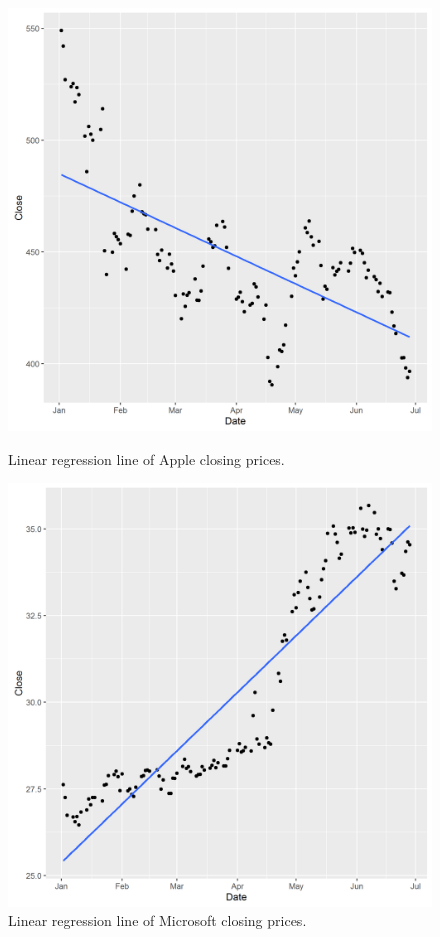 \documentclass[paper=a4, fontsize=11pt]{scrartcl} %
\numberwithin{equation}{section} %
\numberwithin{figure}{section} %
\numberwithin{table}{section} %
\begin{document}
\begin{figure}[!htb]
  \includegraphics[width=\linewidth]{graph/a_reg5.png}
  \caption{Linear regression line of Apple closing prices.}
\endminipage\hfill
{}
  \includegraphics[width=\linewidth]{graph/m_reg5.png}
  \caption{Linear regression line of Microsoft closing prices.}
\endminipage\hfill
\end{figure}
\end{document}
